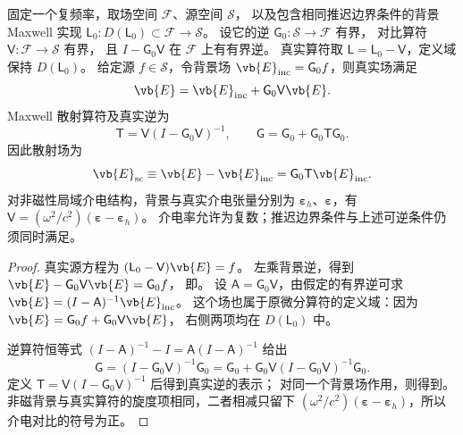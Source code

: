 \begin{proposition}
固定一个复频率，取场空间 $\mathcal F$、源空间 $\mathcal S$，
以及包含相同推迟边界条件的背景 Maxwell 实现
$\mathsf L_0:D(\mathsf L_0)\subset\mathcal F\to\mathcal S$。
设它的逆 $\mathsf G_0:\mathcal S\to\mathcal F$ 有界，
对比算符 $\mathsf V:\mathcal F\to\mathcal S$ 有界，
且 $I-\mathsf G_0\mathsf V$ 在 $\mathcal F$ 上有有界逆。
真实算符取 $\mathsf L=\mathsf L_0-\mathsf V$，定义域保持 $D(\mathsf L_0)$。
给定源 $f\in\mathcal S$，令背景场 $\vb{E}_{\rm inc}=\mathsf G_0f$，则真实场满足
\begin{equation}
\vb{E}=\vb{E}_{\rm inc}+\mathsf G_0\mathsf V\vb{E}.
\label{eq:feqo-maxwell-lippmann}
\end{equation}
Maxwell 散射算符及真实逆为
\begin{equation}
\mathsf T=\mathsf V(I-\mathsf G_0\mathsf V)^{-1},\qquad
\mathsf G=\mathsf G_0+\mathsf G_0\mathsf T\mathsf G_0.
\label{eq:feqo-maxwell-t}
\end{equation}
因此散射场为
\begin{equation}
\vb{E}_{\rm sc}\equiv\vb{E}-\vb{E}_{\rm inc}
=\mathsf G_0\mathsf T\vb{E}_{\rm inc}.
\label{eq:feqo-maxwell-scattered-field}
\end{equation}
对非磁性局域介电结构，背景与真实介电张量分别为
$\boldsymbol\varepsilon_h$、$\boldsymbol\varepsilon$，有
$\mathsf V=(\omega^2/c^2)(\boldsymbol\varepsilon-\boldsymbol\varepsilon_h)$。
介电率允许为复数；推迟边界条件与上述可逆条件仍须同时满足。
\end{proposition}
\begin{proof}
真实源方程为 $(\mathsf L_0-\mathsf V)\vb{E}=f$。
左乘背景逆，得到 $\vb{E}-\mathsf G_0\mathsf V\vb{E}=\mathsf G_0f$，
即。
设 $\mathsf A=\mathsf G_0\mathsf V$，由假定的有界逆可求
$\vb{E}=(I-\mathsf A)^{-1}\vb{E}_{\rm inc}$。
这个场也属于原微分算符的定义域：因为
$\vb{E}=\mathsf G_0f+\mathsf G_0\mathsf V\vb{E}$，
右侧两项均在 $D(\mathsf L_0)$ 中。

逆算符恒等式 $(I-\mathsf A)^{-1}-I=\mathsf A(I-\mathsf A)^{-1}$ 给出
\[
\mathsf G=(I-\mathsf G_0\mathsf V)^{-1}\mathsf G_0
=\mathsf G_0+\mathsf G_0\mathsf V
(I-\mathsf G_0\mathsf V)^{-1}\mathsf G_0.
\]
定义 $\mathsf T=\mathsf V(I-\mathsf G_0\mathsf V)^{-1}$ 后得到真实逆的表示；
对同一个背景场作用，则得到。
非磁背景与真实算符的旋度项相同，二者相减只留下
$(\omega^2/c^2)(\boldsymbol\varepsilon-\boldsymbol\varepsilon_h)$，所以介电对比的符号为正。
\end{proof}

